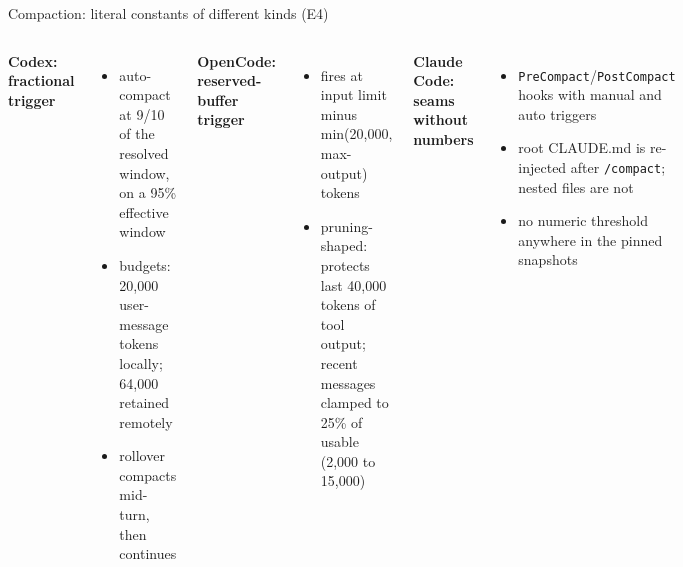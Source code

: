 \documentclass[aspectratio=169,11pt]{beamer}
\newcommand{\codex}[0]{Codex}
\newcommand{\occ}[0]{OpenCode}
\newcommand{\ccc}[0]{Claude Code}
\begin{document}
\begin{frame}{Compaction: literal constants of different kinds (E4)}
  \small
  \begin{columns}[T]
      \textbf{\codex{}: fractional trigger}~\citep{codexRepo}
      \begin{itemize}
        \item auto-compact at 9/10 of the resolved window, on a 95\%
          effective window
        \item budgets: 20{,}000 user-message tokens locally; 64{,}000
          retained remotely
        \item rollover compacts mid-turn, then continues
      \end{itemize}
      \smallskip
      \textbf{\occ{}: reserved-buffer trigger}~\citep{opencodeRepo}
      \begin{itemize}
        \item fires at input limit minus min(20{,}000, max-output)
          tokens
        \item pruning-shaped: protects last 40{,}000 tokens of tool
          output; recent messages clamped to 25\% of usable (2{,}000 to
          15{,}000)
      \end{itemize}
      \textbf{\ccc{}: seams without numbers}
      \begin{itemize}
        \item \texttt{PreCompact}/\texttt{PostCompact} hooks with manual
          and auto triggers~\citep{claudeCodeHooksDocs}
        \item root CLAUDE.md is re-injected after \texttt{/compact};
          nested files are not~\citep{claudeCodeMemoryDocs}
        \item no numeric threshold anywhere in the pinned snapshots
      \end{itemize}
  \end{columns}
\end{frame}
\end{document}
